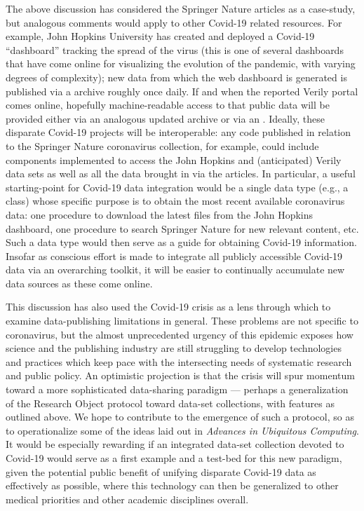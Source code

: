 \documentclass[11pt,letterpaper]{article}
\newcommand{\GIT}{\resizebox{!}{7pt}{\AcronymText{GIT}}}
\newcommand{\API}{\resizebox{!}{7pt}{\AcronymText{API}}}
\newcommand{\textscc}[1]{{\color{orr!35!black}{{%
						\fontfamily{Cabin-TLF}\fontseries{b}\selectfont{\textsc{\scriptsize{#1}}}}}}}
\newcommand{\AcronymText}[1]{{\textscc{#1}}}
\newcommand{\Cpp}{\resizebox{!}{8.5pt}{\AcronymText{C++}}}
\newcommand{\Cnineteen}{\resizebox{!}{7pt}{\AcronymText{CORD-19}}}
\newcommand{\p}[1]{

\vspace{.85em}#1}
\newcommand{\q}[1]{{\fontfamily{qcr}\selectfont ``}#1{\fontfamily{qcr}\selectfont ''}}
\begin{document}
\p{The above discussion has considered the Springer Nature 
articles as a case-study, but analogous comments would 
apply to other Covid-19 related resources.  For 
example, John Hopkins University has created and deployed 
a Covid-19 \q{dashboard} tracking the spread of the virus 
(this is one of several dashboards that have come online 
for visualizing the evolution of the pandemic, with varying 
degrees of complexity); 
new data from which the web dashboard is generated is published 
via a \GIT{} archive roughly once daily.    If and 
when the reported Verily portal comes online, hopefully 
machine-readable access to that public data will be 
provided either via an analogous updated archive or 
via an \API{}.  Ideally, these disparate Covid-19 
projects will be interoperable: any code published 
in relation to the Springer Nature coronavirus 
collection, for example, could include components 
implemented to access the John Hopkins and 
(anticipated) Verily data sets as well as all 
the data brought in via the \Cnineteen{} articles.  
In particular, a useful starting-point for Covid-19 
data integration would be a single data type 
(e.g., a \Cpp{} class) whose specific purpose is 
to obtain the most recent available coronavirus 
data: one procedure to download the latest 
files from the John Hopkins dashboard, one procedure 
to search Springer Nature for new relevant content, 
etc.  Such a data type would then serve as a 
guide for obtaining Covid-19 information.    
Insofar as conscious effort is made to integrate 
all publicly accessible Covid-19 data via 
an overarching toolkit, it will be easier to continually 
accumulate new data sources as these come online.}

\p{This discussion has also used the Covid-19 crisis as a 
lens through which to examine data-publishing limitations 
in general.  These problems are not specific to 
coronavirus, but the almost unprecedented 
urgency of this epidemic exposes how science and the 
publishing industry are still struggling to 
develop technologies and practices which keep pace 
with the intersecting needs of systematic research 
and public policy.  An optimistic projection is 
that the crisis will spur momentum toward a more 
sophisticated data-sharing paradigm --- perhaps a 
generalization of the Research Object protocol 
toward data-set collections, with features as outlined 
above.  We hope to contribute to the emergence of 
such a protocol, so as to operationalize some 
of the ideas laid out in \textit{Advances in Ubiquitous 
Computing}.  It would be especially rewarding if 
an integrated data-set collection devoted to 
Covid-19 would serve as a first example and a test-bed 
for this new paradigm, given the potential public 
benefit of unifying disparate Covid-19 data 
as effectively as possible, where this technology 
can then be generalized to other medical 
priorities and other academic disciplines overall.}
\end{document}
